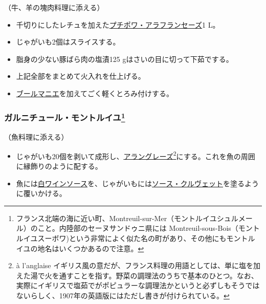 \begin{recette}


（牛、羊の塊肉料理に添える）

\begin{itemize}
\item
  千切りにしたレチュを加えた\protect\hyperlink{petits-pois-a-la-francaise}{プチポワ・アラフランセーズ}1
  L。
\item
  じゃがいも2個はスライスする。
\item
  脂身の少ない豚ばら肉の塩漬125 gはさいの目に切って下茹でする。
\item
  上記全部をまとめて火入れを仕上げる。
\item
  \protect\hyperlink{beurre-manie}{ブールマニエ}を加えてごく軽くとろみ付けする。
\end{itemize}

\hypertarget{garniture-montreuil}{%
\subsubsection[ガルニチュール・モントルイユ]{\texorpdfstring{ガルニチュール・モントルイユ\footnote{フランス北端の海に近い町、Montreuil-sur-Mer（モントルイユシュルメール）のこと。内陸部のセーヌサンドゥニ県には
  Montreuil-sous-Bois（モントルイユスーボワ)という非常によく似た名の町があり、その他にもモントルイユの地名はいくつかあるので注意。}}{ガルニチュール・モントルイユ}}\label{garniture-montreuil}}


  

（魚料理に添える）

\begin{itemize}
\item
  じゃがいも20個を剥いて成形し、\protect\hyperlink{pommes-de-terres-a-l-anglaise}{アラングレーズ}\footnote{à
    l'anglaise
    イギリス風の意だが、フランス料理の用語としては、単に塩を加えた湯で火を通すことを指す。野菜の調理法のうちで基本のひとつ。なお、実際にイギリスで塩茹でがポピュラーな調理法かというと必ずしもそうではないらしく、1907年の英語版にはただし書きが付けられている。}にする。これを魚の周囲に縁飾りのように配する。
\item
  魚には\protect\hyperlink{sauce-vin-blanc}{白ワインソース}を、じゃがいもには\protect\hyperlink{sauce-aux-crevettes}{ソース・クルヴェット}を塗るように覆いかける。
\end{itemize}


\end{recette}
